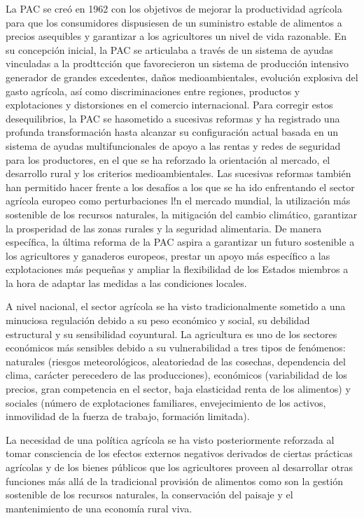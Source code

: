 \documentclass[10pt,a4paper]{article}
\begin{document}
La PAC se creó en 1962 con los objetivos de mejorar la productividad agrícola para que los consumidores dispusiesen de un suministro estable de alimentos a precios asequibles y garantizar a los agricultores un nivel de vida razonable. En su concepción inicial, la PAC se articulaba a través de un sistema de ayudas vinculadas a la prodttcción que favorecieron un sistema de producción intensivo generador de grandes excedentes, daños medioambientales, evolución explosiva del gasto agrícola, así como discriminaciones entre regiones, productos y explotaciones y distorsiones en el comercio internacional. Para corregir estos desequilibrios, la PAC se hasometido a sucesivas reformas y ha registrado una profunda transformación hasta alcanzar su configuración actual basada en un sistema de ayudas multifuncionales de apoyo a las rentas y redes de seguridad para los productores, en el que se ha reforzado la orientación al mercado, el desarrollo rural y los criterios medioambientales. Las sucesivas reformas también han permitido hacer frente a los desafíos a los que se ha ido enfrentando el sector agrícola europeo como perturbaciones l!n el mercado mundial, la utilización más sostenible de los recursos naturales, la mitigación del cambio climático, garantizar la prosperidad de las zonas rurales y la seguridad alimentaria. De manera específica, la última reforma de la PAC aspira a garantizar un futuro sostenible a los agricultores y ganaderos europeos, prestar un apoyo más específico a las explotaciones más pequeñas y ampliar la flexibilidad de los Estados miembros a la hora de adaptar las medidas a las condiciones locales.

A nivel nacional, el sector agrícola se ha visto tradicionalmente sometido a una minuciosa regulación debido a su peso económico y social, su debilidad estructural y su sensibilidad coyuntural. La agricultura es uno de los sectores económicos más sensibles debido a su vulnerabilidad a tres tipos de fenómenos: naturales (riesgos meteorológicos, aleatoriedad de las cosechas, dependencia del clima, carácter perecedero de las producciones), económicos (variabilidad de los precios, gran competencia en el sector, baja elasticidad renta de los alimentos) y sociales (número de explotaciones familiares, envejecimiento de los activos, inmovilidad de la fuerza de trabajo, formación limitada).

La necesidad de una política agrícola se ha visto posteriormente reforzada al tomar consciencia de los efectos externos negativos derivados de ciertas prácticas agrícolas y de los bienes públicos que los agricultores proveen al desarrollar otras funciones más allá de la tradicional provisión de alimentos como son la gestión sostenible de los recursos naturales, la conservación del paisaje y el mantenimiento de una economía rural viva.
\end{document}
